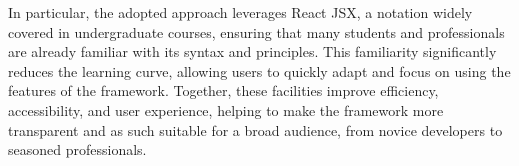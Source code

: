 In particular, the adopted approach leverages React JSX, a notation widely covered in undergraduate courses, ensuring that many students and professionals are already familiar with its syntax and principles. This familiarity significantly reduces the learning curve, allowing users to quickly adapt and focus on using the features of the framework. Together, these facilities improve efficiency, accessibility, and user experience, helping to make the framework more transparent and as such suitable for a broad audience, from novice developers to seasoned professionals.


\begin{comment}
    

\begin{table}[]
    \centering
      \caption{JjOM facilities. (\textbf{da rimuovere?})}
    \label{tab:jjom-api-old}
    \begin{tabular}{|p{2.5cm}|p{1.2cm}|p{7cm}|}
    \hline
        \textbf{JjOM API} & \textbf{Scope} & \textbf{Description}  \\ \hline
        \texttt{id} & \texttt{DObject} \texttt{DClass} & allows access to the unique identifier for the model element, formatted as a pointer. \\ \hline 
        \texttt{allInstances} & \texttt{DClass} & returns all the instances of a given \texttt{DClass} including the instances of its subclasses.\\ \hline
        \texttt{attributes} or \texttt{references} & \texttt{DClass} & returns the collection containing all attributes or references of a \texttt{DClass}.\\ \hline
        \texttt{instanceOf} & \texttt{DObject} & returns a pointer to \texttt{DClass} type of a \texttt{DOject}. \\ \hline
        \texttt{addClass (name : String)} & \texttt{DModel} & add a \texttt{DClass} with a given name to a \texttt{DPackage} or \texttt{DModel} \\ \hline
        \texttt{addObject (param : JSON, className : String)} & \texttt{DModel} & creates an instance of a \texttt{DClass} that matches with \texttt{className} and initializes the attribute values as described in the JSON \texttt{param} \\ \hline
        \texttt{parent} & \texttt{Any} & returns the immediate container.\\ \hline
        \texttt{delete} & \texttt{DClass} \texttt{DObject} \texttt{DValue} & removes the current element from the model. This operation also cleans up references or links to ensure the model remains consistent.\\ \hline
        \texttt{value}  & \texttt{DValue} & (single-valued) value is the actual for attributes or references. It is applicable on attributes and references having a upper-bound equals to 1. \\ \hline
        \texttt{values} & \texttt{DValue}  & (multi-valued) values is an array of data.  \\ \hline
        \texttt{\$<name> (dynamic property)} & \texttt{DClass} \texttt{DModel}& dynamically accesses child elements or instances by exact name.\\ \hline
        

\end{comment}
